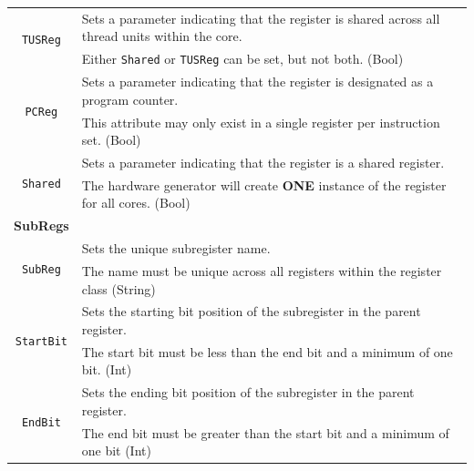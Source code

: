 \documentclass{article}
\begin{document}
\begin{table}[h]
\begin{center}
\begin{tabular}{|c|l|}
\hline
\multirow{2}{*}{\texttt{TUSReg}} & Sets a parameter indicating that the register is shared across all thread units within the core.\\
                                                          & Either \texttt{Shared} or \texttt{TUSReg} can be set, but not both. (Bool)\\
\hline
\multirow{2}{*}{\texttt{PCReg}} & Sets a parameter indicating that the register is designated as a program counter.\\
                                                          & This attribute may only exist in a single register per instruction set.  (Bool)\\
\hline
\multirow{2}{*}{\texttt{Shared}} & Sets a parameter indicating that the register is a shared register.\\
                                                          & The hardware generator will create \textbf{ONE} instance of the register for all cores. (Bool)\\
\hline
\multirow{2}{*}{\textbf{SubRegs}} & \\ & \\
\hline
\multirow{2}{*}{\texttt{SubReg}} & Sets the unique subregister name.\\
                                                          & The name must be unique across all registers within the register class (String)\\
\hline
\multirow{2}{*}{\texttt{StartBit}} & Sets the starting bit position of the subregister in the parent register.\\
                                                          & The start bit must be less than the end bit and a minimum of one bit. (Int)\\
\hline
\multirow{2}{*}{\texttt{EndBit}} & Sets the ending bit position of the subregister in the parent register.\\
                                                          & The end bit must be greater than the start bit and a minimum of one bit (Int)\\
\hline
\end{tabular}
\end{center}
\end{table}  
\end{document}
